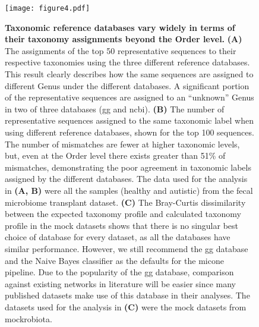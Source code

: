   \begin{figure}[H]
    \centering
    \texttt{[image: figure4.pdf]}
  \end{figure}
  \begin{figure}[H]
    \centering
    \caption{
      \textbf{Taxonomic reference databases vary widely in terms of their taxonomy assignments beyond the Order level.}
      \textbf{(A)} The assignments of the top 50 representative sequences to their respective taxonomies using the three different reference databases.
      This result clearly describes how the same sequences are assigned to different Genus under the different databases.
      A significant portion of the representative sequences are assigned to an ``unknown'' Genus in two of three databases (\ac{gg} and \ac{ncbi}).
      \textbf{(B)} The number of representative sequences assigned to the same taxonomic label when using different reference databases, shown for the top 100 sequences.
      The number of mismatches are fewer at higher taxonomic levels, but, even at the Order level there exists greater than 51\% of mismatches, demonstrating the poor agreement in taxonomic labels assigned by the different databases.
      The data used for the analysis in \textbf{(A, B)} were all the samples (healthy and autistic) from the fecal microbiome transplant dataset.
      \textbf{(C)} The Bray-Curtis dissimilarity between the expected taxonomy profile and calculated taxonomy profile in the mock datasets shows that there is no singular best choice of database for every dataset, as all the databases have similar performance.
      However, we still recommend the \ac{gg} database and the Naive Bayes classifier as the defaults for the \ac{micone} pipeline.
      Due to the popularity of the \ac{gg} database, comparison against existing networks in literature will be easier since many published datasets make use of this database in their analyses.
      The datasets used for the analysis in \textbf{(C)} were the mock datasets from mockrobiota.
    }
    \label{fig:figure4}
  \end{figure}
  \FloatBarrier
  \newpage


